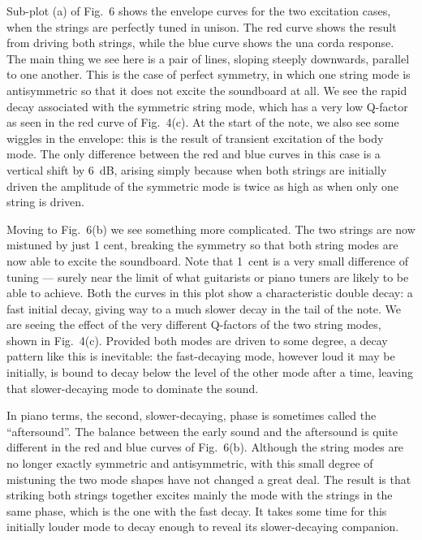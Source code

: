   Sub-plot (a) of Fig.\ 6 shows the envelope curves for the two excitation 
  cases, when the strings are perfectly tuned in unison. The red curve shows 
  the result from driving both strings, while the blue curve shows the una 
  corda response. The main thing we see here is a pair of lines, sloping 
  steeply downwards, parallel to one another. This is the case of perfect 
  symmetry, in which one string mode is antisymmetric so that it does not 
  excite the soundboard at all. We see the rapid decay associated with the 
  symmetric string mode, which has a very low Q-factor as seen in the red curve 
  of Fig.\ 4(c). At the start of the note, we also see some wiggles in the 
  envelope: this is the result of transient excitation of the body mode. The 
  only difference between the red and blue curves in this case is a vertical 
  shift by 6~dB, arising simply because when both strings are initially driven 
  the amplitude of the symmetric mode is twice as high as when only one string 
  is driven. 

  Moving to Fig.\ 6(b) we see something more complicated. The two strings are 
  now mistuned by just 1 cent, breaking the symmetry so that both string modes 
  are now able to excite the soundboard. Note that 1~cent is a very small 
  difference of tuning --- surely near the limit of what guitarists or piano 
  tuners are likely to be able to achieve. Both the curves in this plot show a 
  characteristic double decay: a fast initial decay, giving way to a much 
  slower decay in the tail of the note. We are seeing the effect of the very 
  different Q-factors of the two string modes, shown in Fig.\ 4(c). Provided 
  both modes are driven to some degree, a decay pattern like this is 
  inevitable: the fast-decaying mode, however loud it may be initially, is 
  bound to decay below the level of the other mode after a time, leaving that 
  slower-decaying mode to dominate the sound. 

  In piano terms, the second, slower-decaying, phase is sometimes called the 
  ``aftersound''. The balance between the early sound and the aftersound is 
  quite different in the red and blue curves of Fig.\ 6(b). Although the string 
  modes are no longer exactly symmetric and antisymmetric, with this small 
  degree of mistuning the two mode shapes have not changed a great deal. The 
  result is that striking both strings together excites mainly the mode with 
  the strings in the same phase, which is the one with the fast decay. It takes 
  some time for this initially louder mode to decay enough to reveal its 
  slower-decaying companion. 

